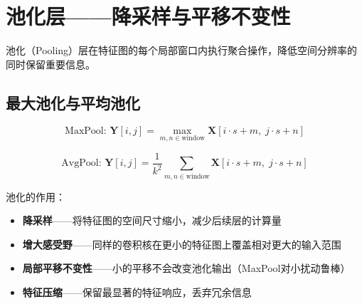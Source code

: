 \section{池化层——降采样与平移不变性}

池化（Pooling）层在特征图的每个局部窗口内执行聚合操作，降低空间分辨率的同时保留重要信息。

\subsection{最大池化与平均池化}

\[
\text{MaxPool: } \mathbf{Y}[i, j] = \max_{m,n \in \text{window}} \mathbf{X}[i \cdot s + m,\; j \cdot s + n]
\]

\[
\text{AvgPool: } \mathbf{Y}[i, j] = \frac{1}{k^2}\sum_{m,n \in \text{window}} \mathbf{X}[i \cdot s + m,\; j \cdot s + n]
\]

池化的作用：
\begin{itemize}
    \item \textbf{降采样}——将特征图的空间尺寸缩小，减少后续层的计算量
    \item \textbf{增大感受野}——同样的卷积核在更小的特征图上覆盖相对更大的输入范围
    \item \textbf{局部平移不变性}——小的平移不会改变池化输出（MaxPool对小扰动鲁棒）
    \item \textbf{特征压缩}——保留最显著的特征响应，丢弃冗余信息
\end{itemize}

